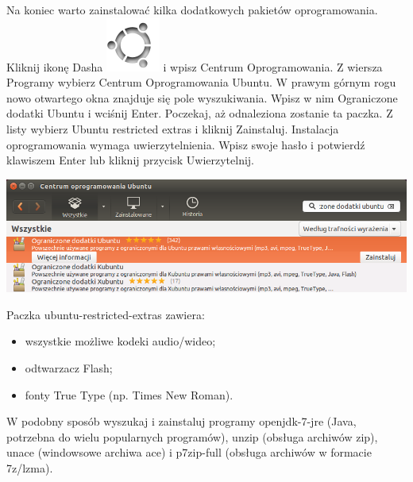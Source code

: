 Na koniec warto zainstalować kilka dodatkowych pakietów oprogramowania. Kliknij ikonę Dasha \includegraphics[scale=0.35]{images/ikony_dash.png} i wpisz \textcolor{ubuntu_orange}{Centrum Oprogramowania}. Z wiersza \textcolor{ubuntu_orange}{Programy} wybierz \textcolor{ubuntu_orange}{Centrum Oprogramowania Ubuntu}. W prawym górnym rogu nowo otwartego okna znajduje się pole wyszukiwania. Wpisz w nim \textcolor{ubuntu_orange}{Ograniczone dodatki Ubuntu} i wciśnij Enter. Poczekaj, aż odnaleziona zostanie ta paczka. Z listy wybierz \textcolor{ubuntu_orange}{Ubuntu restricted extras} i kliknij \textcolor{ubuntu_orange}{Zainstaluj}. Instalacja oprogramowania wymaga uwierzytelnienia. Wpisz swoje hasło i potwierdź klawiszem Enter lub kliknij przycisk \textcolor{ubuntu_orange}{Uwierzytelnij}.
\begin{center}
	\includegraphics[width=\linewidth]{images/pierwsze_uruchomienie_dodatki2.png}
\end{center}

Paczka \textcolor{ubuntu_orange}{ubuntu-restricted-extras} zawiera:
\begin{itemize}
\item wszystkie możliwe kodeki audio/wideo;
\item odtwarzacz Flash;
\item fonty True Type (np. Times New Roman).
\end{itemize}
W podobny sposób wyszukaj i zainstaluj programy \textcolor{ubuntu_orange}{openjdk-7-jre} (Java, potrzebna do wielu popularnych programów), \textcolor{ubuntu_orange}{unzip} (obsługa archiwów zip), \textcolor{ubuntu_orange}{unace} (windowsowe archiwa ace) i \textcolor{ubuntu_orange}{p7zip-full} (obsługa archiwów w formacie 7z/lzma).
\clearpage
